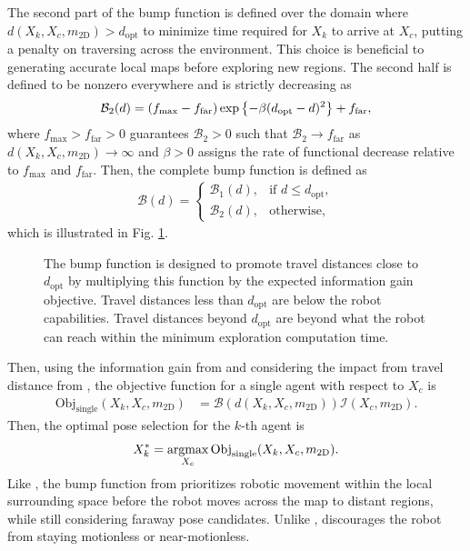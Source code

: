 The second part of the bump function is defined over the domain where \\$d(X_k,X_c,m_\text{2D})>d_\text{opt}$ to minimize time required for $X_k$ to arrive at $X_c$, putting a penalty on traversing across the environment. This choice is beneficial to generating accurate local maps before exploring new regions. The second half is defined to be nonzero everywhere and is strictly decreasing as 
\begin{align}
\label{eqn:BumpFunDecreasing}
\mathcal B_2(d)=(f_\text{max}-f_\text{far})\exp\left\{ -\beta(d_\text{opt}-d)^2 \right\}+f_\text{far},
\end{align}
where $f_\text{max}>f_\text{far}>0$ guarantees $\mathcal B_2>0$ such that $\mathcal B_2\rightarrow f_\text{far}$ as $d(X_k,X_c,m_\text{2D})\rightarrow\infty$ and $\beta>0$ assigns the rate of functional decrease relative to $f_\text{max}$ and $f_\text{far}$. Then, the complete bump function is defined as
\begin{align}
\label{eqn:BumpFun}
\mathcal B(d)=
\begin{cases}
    \mathcal B_1(d),		& \text{if }d\leq d_\text{opt},\\
    \mathcal B_2(d),         & \text{otherwise},
\end{cases}
\end{align}
which is illustrated in Fig. \ref{fig:nonzeroBumpFun}. %

	\begin{figure}
		\caption{The bump function is designed to promote travel distances close to $d_\text{opt}$ by multiplying this function by the expected information gain objective. Travel distances less than $d_\text{opt}$ are below the robot capabilities. Travel distances beyond $d_\text{opt}$ are beyond what the robot can reach within the minimum exploration computation time.}
		\label{fig:nonzeroBumpFun}
	\end{figure}
	
Then, using the information gain from  and considering the impact from travel distance from , the objective function for a single agent with respect to $X_{c}$ is
\begin{align}
\label{eqn:CandidateBidSingle}
\text{Obj}_\text{single}(X_k,X_c,m_\text{2D})&=\mathcal B(d(X_k,X_c,m_\text{2D}))\mathcal I(X_{c},m_\text{2D}).
\end{align}
Then, the optimal pose selection for the $k$-th agent is
\begin{align}
\label{eqn:OptPoseSingle}
X^*_{k}=\argmax_{X_c}\text{Obj}_\text{single}(X_k,X_c,m_\text{2D}).
\end{align}
Like , the bump function from  prioritizes robotic movement within the local surrounding space before the robot moves across the map to distant regions, while still considering faraway pose candidates. Unlike ,  discourages the robot from staying motionless or near-motionless.

